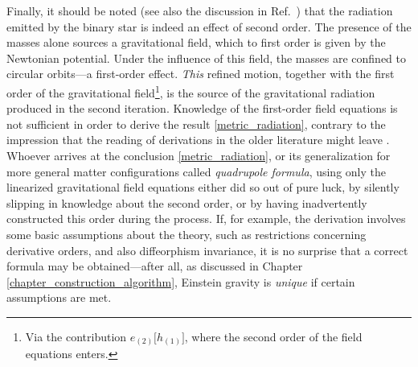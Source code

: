 Finally, it should be noted (see also the discussion in Ref.~\cite{poisson2014gravity}) that the radiation emitted by the binary star is indeed an effect of second order. The presence of the masses alone sources a gravitational field, which to first order is given by the Newtonian potential. Under the influence of this field, the masses are confined to circular orbits---a first-order effect. \emph{This} refined motion, together with the first order of the gravitational field\footnote{Via the contribution $e_{(2)}\lbrack h_{(1)}\rbrack$, where the second order of the field equations enters.}, is the source of the gravitational radiation produced in the second iteration. Knowledge of the first-order field equations is not sufficient in order to derive the result \eqref{metric_radiation}, contrary to the impression that the reading of derivations in the older literature might leave \cite{mtw?}. Whoever arrives at the conclusion \eqref{metric_radiation}, or its generalization for more general matter configurations called \emph{quadrupole formula}, using only the linearized gravitational field equations either did so out of pure luck, by silently slipping in knowledge about the second order, or by having inadvertently constructed this order during the process. If, for example, the derivation involves some basic assumptions about the theory, such as restrictions concerning derivative orders, and also diffeorphism invariance, it is no surprise that a correct formula may be obtained---after all, as discussed in Chapter \ref{chapter_construction_algorithm}, Einstein gravity is \emph{unique} if certain assumptions are met.

